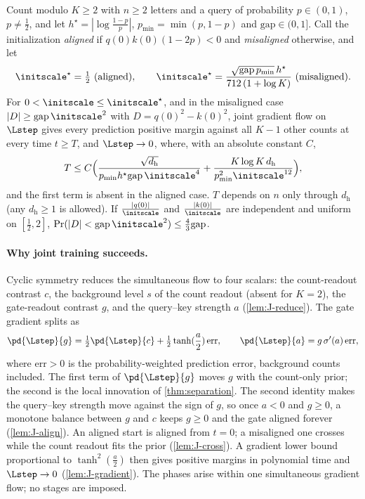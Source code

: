 \begin{theorem}
\label{thm:joint}
Count modulo $K\ge2$ with $n\ge2$ letters and a query of probability $p\in(0,1)$, $p\neq\tfrac{1}{2}$, and let $h^\star=|\log\tfrac{1-p}{p}|$,
$p_{\min}=\min(p,1-p)$ and $\mathrm{gap}\in(0,1]$. Call the initialization \emph{aligned} if $q(0)k(0)(1-2p)<0$ and \emph{misaligned} otherwise, and let
\[
 \initscale^\star=\tfrac{1}{2}\ \text{(aligned)},\qquad \initscale^\star=\frac{\sqrt{\mathrm{gap}\,p_{\min}}\,h^\star}{712\,(1+\log K)}\ \text{(misaligned)}.
\]
For $0<\initscale\le\initscale^\star$, and in the misaligned case $|D|\ge\mathrm{gap}\,\initscale^2$ with $D=q(0)^2-k(0)^2$, joint gradient flow on $\Lstep$ gives
every prediction positive margin against all $K-1$ other counts at every time $t\ge T$, and $\Lstep\to0$, where, with an absolute constant $C$,
\[
 T\le C\Bigl(\frac{\sqrt{d_{\mathrm h}}}{p_{\min}h^\star\mathrm{gap}\,\initscale^4}+\frac{K\log K\,d_{\mathrm h}}{p_{\min}^2\initscale^{12}}\Bigr),
\]
and the first term is absent in the aligned case. $T$ depends on $n$ only through $d_{\mathrm h}$ (any $d_{\mathrm h}\ge1$ is allowed). If $\frac{|q(0)|}{\initscale}$ and
$\frac{|k(0)|}{\initscale}$ are independent and uniform on $[\tfrac{1}{2},2]$, $\Pr(|D|<\mathrm{gap}\,\initscale^2)\le\tfrac{4}{3}\mathrm{gap}$.
\end{theorem}

\paragraph{Why joint training succeeds.} Cyclic symmetry reduces the simultaneous flow to four scalars: the count-readout contrast $c$,
the background level $s$ of the count readout (absent for $K=2$), the gate-readout contrast $g$, and the query--key strength $a$
(\cref{lem:J-reduce}). The gate gradient splits as
\[
 \pd{\Lstep}{g}=\tfrac{1}{2}\pd{\Lstep}{c}+\tfrac{1}{2}\tanh(\frac{a}{2})\,\mathrm{err},\qquad \pd{\Lstep}{a}=g\,\sigma'(a)\,\mathrm{err},
\]
where $\mathrm{err}>0$ is the probability-weighted prediction error, background counts included. The first term of $\pd{\Lstep}{g}$ moves $g$ with the
count-only prior; the second is the local innovation of \cref{thm:separation}. The second identity makes the query--key strength move against
the sign of $g$, so once $a<0$ and $g\ge0$, a monotone balance between $g$ and $c$ keeps $g\ge0$ and the gate aligned forever (\cref{lem:J-align}).
An aligned start is aligned from $t=0$; a misaligned one crosses while the count readout fits the prior (\cref{lem:J-cross}). A gradient lower bound
proportional to $\tanh^2(\frac{a}{2})$ then gives positive margins in polynomial time and $\Lstep\to0$ (\cref{lem:J-gradient}). The phases arise
within one simultaneous gradient flow; no stages are imposed.

